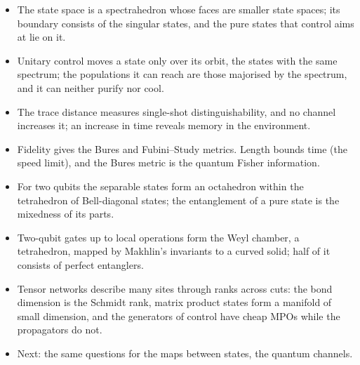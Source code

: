 \documentclass[handoutsbeamer.tex]{subfiles}
\begin{document}
\begin{frame}\mop{\footnotesize}
\begin{itemize}\setlength\itemsep{0.25em}
    \item The state space is a spectrahedron whose faces are smaller state spaces; its boundary consists of the singular states, and the pure states that control aims at lie on it.
    \item Unitary control moves a state only over its orbit, the states with the same spectrum; the populations it can reach are those majorised by the spectrum, and it can neither purify nor cool.
    \item The trace distance measures single-shot distinguishability, and no channel increases it; an increase in time reveals memory in the environment.
    \item Fidelity gives the Bures and Fubini--Study metrics. Length bounds time (the speed limit), and the Bures metric is the quantum Fisher information.
    \item For two qubits the separable states form an octahedron within the tetrahedron of Bell-diagonal states; the entanglement of a pure state is the mixedness of its parts.
    \item Two-qubit gates up to local operations form the Weyl chamber, a tetrahedron, mapped by Makhlin's invariants to a curved solid; half of it consists of perfect entanglers.
    \item Tensor networks describe many sites through ranks across cuts: the bond dimension is the Schmidt rank, matrix product states form a manifold of small dimension, and the generators of control have cheap MPOs while the propagators do not.
    \item Next: the same questions for the maps between states, the quantum channels.
\end{itemize}
\end{frame}

\biblio
\end{document}
